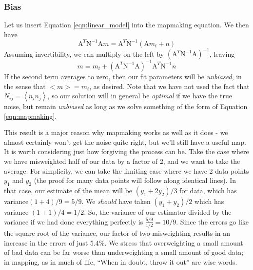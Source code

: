 \documentclass[12]{article}
\begin{document}
\subsubsection{Bias}
Let us insert Equation \ref{eqn:linear_model} into the mapmaking
equation.  We then have
\begin{equation}
\mathrm{A}^T \mathrm{N}^{-1} \mathrm{A}m =\mathrm{A}^T \mathrm{N}^{-1}
\left ( \mathrm{A}m_t+n \right )
\end{equation}
Assuming invertibility, we can multiply on the left by $(\mathrm{A}^T
\mathrm{N}^{-1} \mathrm{A})^{-1}$, leaving
\begin{equation}
\label{eqn:bias}
m=m_t+ \left (\mathrm{A}^T                                                                                                                                                 
\mathrm{N}^{-1} \mathrm{A} \right )^{-1} \mathrm{A}^T\mathrm{N}^{-1} n
\end{equation}
If the second term averages to zero, then our fit parameters will be
{\textit{unbiased}}, in the sense that $<m>=m_t$, as desired.  Note
that we have not used the fact that $N_{ij}=\left < n_i n_j \right >$,
so our solution will in general be {\textit{optimal}} if we have the
true noise, but remain {\textit{unbiased}} as long as we solve
something of the form of Equation \ref{eqn:mapmaking}.  

This result is a major reason why mapmaking works as well as it does -
we almost certainly won't get the noise quite right, but we'll still
have a useful map.  It is worth considering just how forgiving the
process can be.  Take the case where we have misweighted half of our
data by a factor of 2, and we want to take the average.  For
simplicity, we can take the limiting case where we have 2 data points
$y_1$ and $y_2$ (the proof for many data points will follow along
identical lines).  In that case,  our estimate of the mean will be
$(y_1+2y_2)/3$ for data, which has variance$(1+4)/9 = 5/9$.  We
{\textit{should}} have taken $(y_1+y_2)/2$ which has variance
$(1+1)/4=1/2$.  So, the variance of our estimator divided by the
variance if we had done everything perfectly is
$\frac{5/9}{1/2}=10/9$.  Since the errors go like the square root of
the variance, our factor of two misweighting results in an increase in
the errors of just 5.4\%.  We stress that overweighting a small amount
of bad data can be far worse than underweighting a small amount of
good data; in mapping, as in much of life, ``When in doubt, throw it
out'' are wise words.
\end{document}
